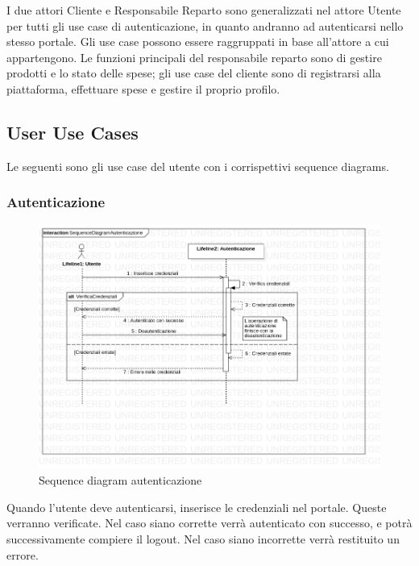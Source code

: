 \documentclass[12pt, a4paper]{article}
\numberwithin{equation}{section} %
\begin{document}
I due attori Cliente e Responsabile Reparto sono generalizzati nel attore Utente
per tutti gli use case di autenticazione, in quanto andranno ad autenticarsi
nello stesso portale.  Gli use case possono essere raggruppati in base 
all'attore a cui appartengono. Le funzioni principali del responsabile reparto 
sono di gestire prodotti e lo stato delle spese; gli use case del cliente sono
di registrarsi alla piattaforma, effettuare spese e gestire il proprio profilo.

\newpage

\subsection{User Use Cases}

Le seguenti sono gli use case del utente con i corrispettivi sequence diagrams.

\subsubsection{Autenticazione}

\begin{figure}[h]
\centering
\includegraphics[width=\textwidth]{Use Case Model!Autenticazione!InteractionAutenticazione!SequenceDiagramAutenticazione_7.png}
\caption{Sequence diagram autenticazione}
\end{figure}

Quando l'utente deve autenticarsi, inserisce le credenziali nel portale. Queste
verranno verificate. Nel caso siano corrette verrà autenticato con successo, e 
potrà successivamente compiere il logout. Nel caso siano incorrette verrà
restituito un errore.
\end{document}

